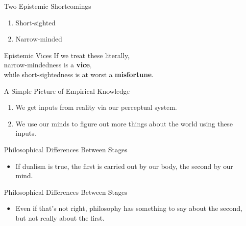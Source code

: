 \documentclass[
  17pt,
  letterpaper,
  ignorenonframetext,
  aspectratio=169,
]{beamer}
\providecommand{\tightlist}{%
  \setlength{\itemsep}{0pt}\setlength{\parskip}{0pt}}\usepackage{longtable,booktabs,array}
\begin{document}
\begin{frame}{Two Epistemic Shortcomings}
\protect\hypertarget{two-epistemic-shortcomings}{}
\begin{enumerate}[<+->]
\item
  Short-sighted
\item
  Narrow-minded
\end{enumerate}
\end{frame}

\begin{frame}{Epistemic Vices}
\protect\hypertarget{epistemic-vices}{}
If we treat these literally,\\
\hspace*{0.333em}\hspace*{0.333em}\hspace*{0.333em}\hspace*{0.333em}narrow-mindedness
is a \textbf{vice},\\
\hspace*{0.333em}\hspace*{0.333em}\hspace*{0.333em}\hspace*{0.333em}while
short-sightedness is at worst a \textbf{misfortune}.
\end{frame}

\begin{frame}{A Simple Picture of Empirical Knowledge}
\protect\hypertarget{a-simple-picture-of-empirical-knowledge}{}
\begin{enumerate}[<+->]
\tightlist
\item
  We get inputs from reality via our perceptual system.
\item
  We use our minds to figure out more things about the world using these
  inputs.
\end{enumerate}
\end{frame}

\begin{frame}{Philosophical Differences Between Stages}
\protect\hypertarget{philosophical-differences-between-stages}{}
\begin{itemize}[<+->]
\tightlist
\item
  If dualism is true, the first is carried out by our body, the second
  by our mind.
\end{itemize}
\end{frame}

\begin{frame}{Philosophical Differences Between Stages}
\protect\hypertarget{philosophical-differences-between-stages-1}{}
\begin{itemize}[<+->]
\tightlist
\item
  Even if that's not right, philosophy has something to say about the
  second, but not really about the first.
\end{itemize}
\end{frame}
\end{document}
